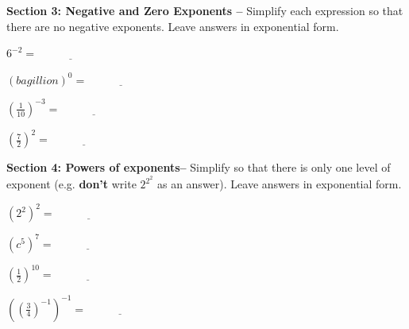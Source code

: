 \documentclass[12pt]{article}
\begin{document}
\hrulefill

\textbf{Section 3: Negative and Zero Exponents --} Simplify each expression so that there are no negative exponents. Leave answers in exponential form.

\begin{enumerate}[resume]
\begin{multicols}{2}

	\item $6^{-2}=\underline{\hspace{1in}}$\\

	\item $(bagillion)^0=\underline{\hspace{1in}}$\\
	
	\item $\left(\frac{1}{10}\right)^{-3}=\underline{\hspace{1in}}$\\
	
	\item $\left(\frac{7}{2}\right)^{2}=\underline{\hspace{1in}}$\\
	
	
\end{multicols}
\end{enumerate}

\hrulefill

\textbf{Section 4: Powers of exponents--} Simplify so that there is only one level of exponent (e.g. \textbf{don't} write $2^{2^2}$ as an answer). Leave answers in exponential form.

\begin{enumerate}[resume]
\begin{multicols}{2}

	\item $\left(2^2\right)^2=\underline{\hspace{1in}}$\\
	
	\item $\left(c^5\right)^7=\underline{\hspace{1in}}$\\
	
	\item $\left(\frac{1}{2}\right)^{10}=\underline{\hspace{1in}}$\\
	
	\item $\left(\left(\frac{3}{4}\right)^{-1}\right)^{-1}=\underline{\hspace{1in}}$\\

\end{multicols}
\end{enumerate}
\end{document}
